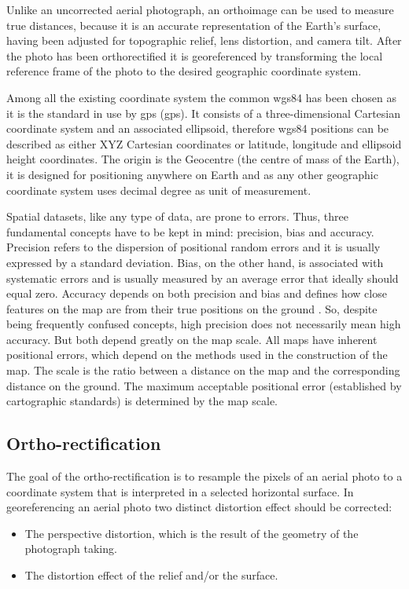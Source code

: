 Unlike an uncorrected aerial photograph, an orthoimage can be used to measure true distances, because it is an accurate representation of the Earth's surface, having been adjusted for topographic relief, lens distortion, and camera tilt.
After the photo has been orthorectified it is georeferenced by transforming the local reference frame of the photo to the desired geographic coordinate system.\par
Among all the existing coordinate system the common \acrshort{wgs84} has been chosen as it is the standard in use by \acrshort{gps} (\acrlong{gps}). It consists of a three-dimensional Cartesian coordinate system and an associated ellipsoid, therefore \acrshort{wgs84} positions can be described as either XYZ Cartesian coordinates or latitude, longitude and ellipsoid height coordinates. The origin is the Geocentre (the centre of mass of the Earth), it is designed for positioning anywhere on Earth and as any other geographic coordinate system uses decimal degree as unit of measurement.\par
Spatial datasets, like any type of data, are prone to errors. Thus, three fundamental concepts have to be kept in mind: precision, bias and accuracy. Precision refers to the dispersion of positional random errors and it is usually expressed by a standard deviation. Bias, on the other hand, is associated with systematic errors and is usually measured by an average error that ideally should equal zero. Accuracy depends on both precision and bias and defines how close features on the map are from their true positions on the ground \cite{geoInformationSystem}. So, despite being frequently confused concepts, high precision does not necessarily mean high accuracy. But both depend greatly on the map scale. All maps have inherent positional errors, which depend on the methods used in the construction of the map. The scale is the ratio between a distance on the map and the corresponding distance on the ground. The maximum acceptable positional error (established by cartographic standards) is determined by the map scale.

\subsection{Ortho-rectification} %
\label{sub:ortho_rectification}
The goal of the ortho-rectification is to resample the pixels of an aerial photo to a coordinate system that is interpreted in a selected horizontal surface.
In georeferencing an aerial photo two distinct distortion effect should be corrected:
\begin{itemize}
	\item The perspective distortion, which is the result of the geometry of the photograph taking.
	\item The distortion effect of the relief and/or the surface.
\end{itemize}

